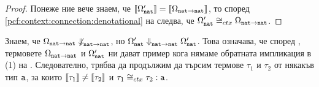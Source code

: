\begin{proof}
  Понеже ние вече знаем, че $\llbracket{\Omega'_{\texttt{nat}}}\rrbracket = \llbracket{\Omega_{\texttt{nat}\to\texttt{nat}}}\rrbracket$, то
  според \ref{pcf:context:connection:denotational} на  следва, че
  $\Omega'_{\texttt{nat}} \cong_{ctx} \Omega_{\texttt{nat}\to\texttt{nat}}$.
\end{proof}

Знаем, че $\Omega_{\texttt{nat}\to\texttt{nat}} \not\Downarrow^{}_{\texttt{nat}\to\texttt{nat}}$, но $\Omega'_{\texttt{nat}} \Downarrow^{}_{\texttt{nat}\to\texttt{nat}} \Omega'_{\texttt{nat}}$.
Това означава, че според , термовете $\Omega_{\texttt{nat}\to\texttt{nat}}$ и $\Omega'_{\texttt{nat}}$ ни дават пример кога нямаме обратната импликация в (1) на .
Следователно, трябва да продължим да търсим термове $\tau_1$ и $\tau_2$ от някакъв тип $\texttt{a}$, за които $\llbracket{\tau_1}\rrbracket \neq \llbracket{\tau_2}\rrbracket$
и $\tau_1 \cong_{ctx} \tau_2 : \texttt{a}$.

\newpage

